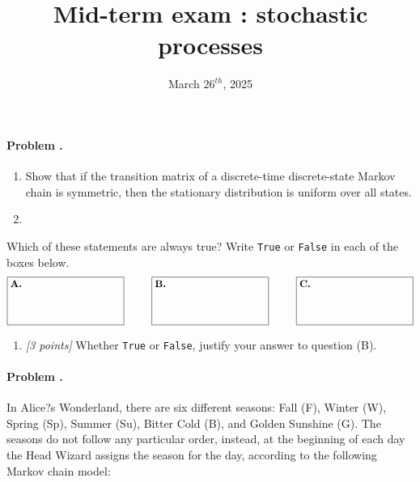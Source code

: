 \documentclass[article,12pt,a4paper]{article}
\title{ \bfseries \Huge {Mid-term exam : stochastic processes}}
\date{March $26^{th}$, 2025}
\newcounter{num}  %
\begin{document}
	
	\setcounter{num}{1}  %
		
		\paragraph{Problem \thenum.}
		\begin{enumerate}
			\item Show that if the transition matrix of a discrete-time discrete-state Markov chain is symmetric, then the stationary distribution is
			uniform over all states.
			\item
		\end{enumerate}
		
		Which of these statements are always true? Write \texttt{True} or \texttt{False} in each of the boxes below.
		\[
		\fbox{\parbox[c][1.5cm][t]{4cm}{\textbf{A.} \hspace{0.5cm}}} \hspace{1cm} 
		\fbox{\parbox[c][1.5cm][t]{4cm}{\textbf{B.} \hspace{0.5cm}}} \hspace{1cm} 
		\fbox{\parbox[c][1.5cm][t]{4cm}{\textbf{C.} \hspace{0.5cm}}}
		\]
		
		\begin{enumerate}
			\item \textit{[3 points]} Whether \texttt{True} or \texttt{False}, justify your answer to question (B).
		\end{enumerate}
		
		
		\newpage
		
		\paragraph{Problem \thenum.}
		In Alice?s Wonderland, there are six different seasons: Fall (F), Winter (W), Spring (Sp), Summer (Su),
		Bitter Cold (B), and Golden Sunshine (G). The seasons do not follow any particular order, instead, at
		the beginning of each day the Head Wizard assigns the season for the day, according to the following
		Markov chain model:
		
\end{document}
